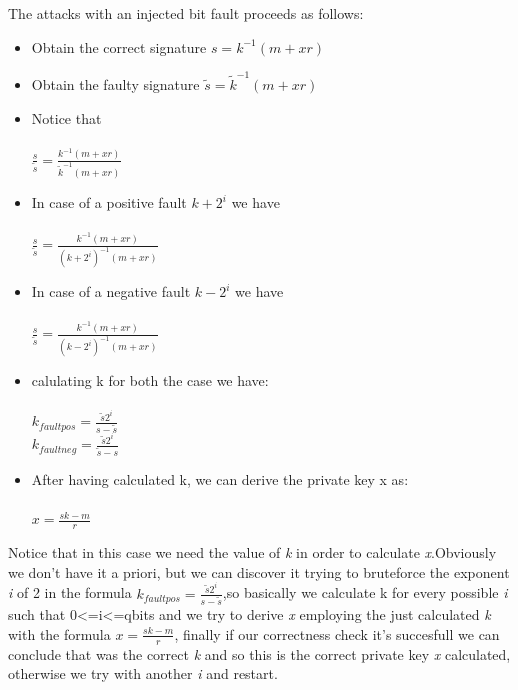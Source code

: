 \documentclass[11pt,english]{article}
\begin{document}
The attacks with an injected bit fault proceeds as follows: 
\begin{itemize}
\item Obtain the correct signature $s = k^{-1}(m + xr) $
\item Obtain the faulty signature $\tilde{s} = \tilde{k}^{-1}(m + xr)$
\item Notice that \\\\$\frac{s}{\tilde{s}}  = \frac{k^{-1}(m+xr)}{\tilde{k}^{-1}(m+xr)}$

\item In case of a positive fault $k+2^{i} $ we have \\\\$\frac{s}{\tilde{s}} = \frac{k^{-1}(m+xr)}{(k+2^{i})^{-1}(m+xr)}$

\item In case of a negative fault $k-2^{i} $ we have\\\\ $\frac{s}{\tilde{s}} = \frac{k^{-1}(m+xr)}{(k-2^{i})^{-1}(m+xr)}$

\item calulating k for both the case we have: \\\\$k_{faultpos} = \frac{\tilde{s}2^{i}}{s-\tilde{s}}$ \\
$k_{faultneg} = \frac{\tilde{s}2^{i}}{\tilde{s}-s}$ 

\item After having calculated k, we can derive the private key x as:\\\\ $x = \frac{sk - m}{r}$


\end{itemize}

Notice that in this case we need the value of \textit{k} in order to calculate \textit{x}.Obviously we don't have it a priori, but we can discover it trying to bruteforce the exponent \textit{i} of 2 in the formula $k_{faultpos} = \frac{\tilde{s}2^{i}}{s-\tilde{s}}$,so basically we calculate k for every possible \textit{i} such that 0<=i<=qbits and we try to derive \textit{x} employing the just calculated \textit{k} with the formula $x = \frac{sk - m}{r}$, finally if our correctness check it's succesfull we can conclude that was the correct \textit{k} and so this is the correct private key \textit{x} calculated, otherwise we try with another \textit{i} and restart.
\end{document}

